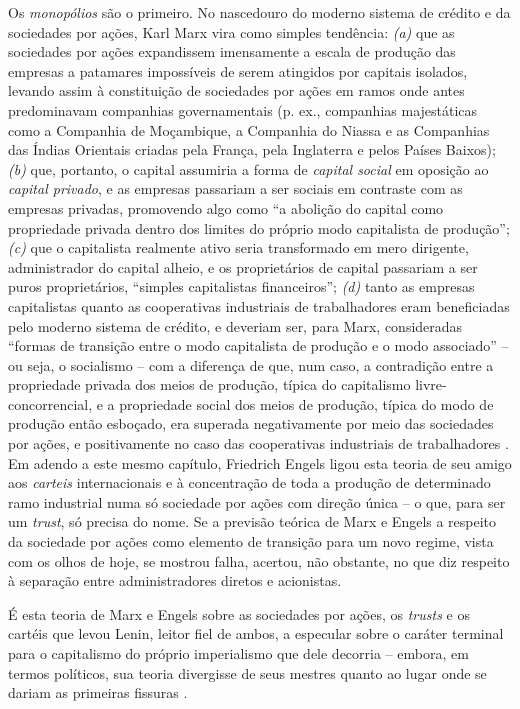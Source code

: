Os \textit{monopólios} são o primeiro. No nascedouro do moderno sistema de crédito e da sociedades por ações, Karl Marx vira como simples tendência: \textit{(a)} que as sociedades por ações expandissem imensamente a escala de produção das empresas a patamares impossíveis de serem atingidos por capitais isolados, levando assim à constituição de sociedades por ações em ramos onde antes predominavam companhias governamentais (p. ex., companhias majestáticas como a Companhia de Moçambique, a Companhia do Niassa e as Companhias das Índias Orientais criadas pela França, pela Inglaterra e pelos Países Baixos); \textit{(b)} que, portanto, o capital assumiria a forma de \textit{capital social} em oposição ao \textit{capital privado}, e as empresas passariam a ser sociais em contraste com as empresas privadas, promovendo algo como ``a abolição do capital como propriedade privada dentro dos limites do próprio modo capitalista de produção''; \textit{(c)} que o capitalista realmente ativo seria transformado em mero dirigente, administrador do capital alheio, e os proprietários de capital passariam a ser puros proprietários, ``simples capitalistas financeiros''; \textit{(d)} tanto as empresas capitalistas quanto as cooperativas industriais de trabalhadores eram beneficiadas pelo moderno sistema de crédito, e deveriam ser, para Marx, consideradas ``formas de transição entre o modo capitalista de produção e o modo associado'' -- ou seja, o socialismo -- com a diferença de que, num caso, a contradição entre a propriedade privada dos meios de produção, típica do capitalismo livre-concorrencial, e a propriedade social dos meios de produção, típica do modo de produção então esboçado, era superada negativamente por meio das sociedades por ações, e positivamente no caso das cooperativas industriais de trabalhadores \cite[p.~581-588]{MARX2008a}. Em adendo a este mesmo capítulo, Friedrich Engels ligou esta teoria de seu amigo aos \textit{carteis} internacionais e à concentração de toda a produção de determinado ramo industrial numa só sociedade por ações com direção única \cite[p.~584]{MARX2008a} -- o que, para ser um \textit{trust}, só precisa do nome. Se a previsão teórica de Marx e Engels a respeito da sociedade por ações como elemento de transição para um novo regime, vista com os olhos de hoje, se mostrou falha, acertou, não obstante, no que diz respeito à separação entre administradores diretos e acionistas. 

É esta teoria de Marx e Engels sobre as sociedades por ações, os \textit{trusts} e os cartéis que levou Lenin, leitor fiel de ambos, a especular sobre o caráter terminal para o capitalismo do próprio imperialismo que dele decorria -- embora, em termos políticos, sua teoria divergisse de seus mestres quanto ao lugar onde se dariam as primeiras fissuras \cite{lenin_imperialismo_1987}.

